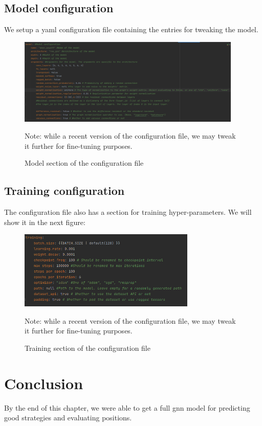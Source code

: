 \subsection{Model configuration}
We setup a \acrshort{yaml} configuration file containing the entries for tweaking the model.
\begin{figure}[ht]
	\centering
	\includegraphics[width=0.95\textwidth]{Figures/ModelConfiguration.png}
	\caption{Model section of the configuration file \label{fig:ModelConfiguration}}
	\small{Note: while a recent version of the configuration file, we may tweak it further for fine-tuning purposes.}
\end{figure}
\FloatBarrier
\subsection{Training configuration}
The configuration file also has a section for training hyper-parameters. We will show it in the next figure:
\begin{figure}[H]
	\centering
	\includegraphics[width=0.75\textwidth]{Figures/TrainingConfiguration.png}
	\caption{Training section of the configuration file\label{fig:TrainingConfiguration}}
	\small{Note: while a recent version of the configuration file, we may tweak it further for fine-tuning purposes.}
\end{figure}

\newpage

\section*{Conclusion}
By the end of this chapter, we were able to get a full \acrshort{gnn} model for predicting good strategies and evaluating positions.

